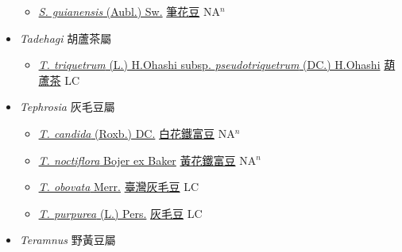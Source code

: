\begin{itemize}
  \begin{itemize}
        \item[] \href{http://www.theplantlist.org/tpl1.1/search?q=Stylosanthes+guianensis}{\textit{S. guianensis} (Aubl.) Sw.}   \href{\detokenize{http://taibnet.sinica.edu.tw/chi/taibnet_species_list.php?T2=筆花豆&T2_new_value=true&fr=y}}{筆花豆} NA$^n$
  \end{itemize}
 \item[] \textit{Tadehagi} 胡蘆茶屬
                    
  \begin{itemize}
        \item[] \href{http://www.theplantlist.org/tpl1.1/search?q=Tadehagi+triquetrum+subsp.+pseudotriquetrum}{\textit{T. triquetrum} (L.) H.Ohashi subsp. \textit{pseudotriquetrum} (DC.) H.Ohashi}   \href{\detokenize{http://taibnet.sinica.edu.tw/chi/taibnet_species_list.php?T2=葫蘆茶&T2_new_value=true&fr=y}}{葫蘆茶} LC
  \end{itemize}
 \item[] \textit{Tephrosia} 灰毛豆屬
                    
  \begin{itemize}
        \item[] \href{http://www.theplantlist.org/tpl1.1/search?q=Tephrosia+candida}{\textit{T. candida} (Roxb.) DC.}   \href{\detokenize{http://taibnet.sinica.edu.tw/chi/taibnet_species_list.php?T2=白花鐵富豆&T2_new_value=true&fr=y}}{白花鐵富豆} NA$^n$
        \item[] \href{http://www.theplantlist.org/tpl1.1/search?q=Tephrosia+noctiflora}{\textit{T. noctiflora} Bojer ex Baker}   \href{\detokenize{http://taibnet.sinica.edu.tw/chi/taibnet_species_list.php?T2=黃花鐵富豆&T2_new_value=true&fr=y}}{黃花鐵富豆} NA$^n$
        \item[] \href{http://www.theplantlist.org/tpl1.1/search?q=Tephrosia+obovata}{\textit{T. obovata} Merr.}   \href{\detokenize{http://taibnet.sinica.edu.tw/chi/taibnet_species_list.php?T2=臺灣灰毛豆&T2_new_value=true&fr=y}}{臺灣灰毛豆} LC
        \item[] \href{http://www.theplantlist.org/tpl1.1/search?q=Tephrosia+purpurea}{\textit{T. purpurea} (L.) Pers.}   \href{\detokenize{http://taibnet.sinica.edu.tw/chi/taibnet_species_list.php?T2=灰毛豆&T2_new_value=true&fr=y}}{灰毛豆} LC
  \end{itemize}
 \item[] \textit{Teramnus} 野黃豆屬
                    

\end{itemize}
